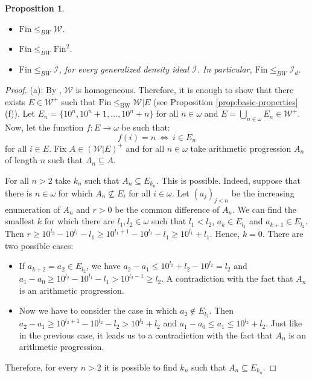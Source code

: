 \documentclass{amsart}
\theoremstyle{plain}
\newtheorem{proposition}[theorem]{Proposition}
\theoremstyle{definition}
\theoremstyle{remark}
\newcommand{\cI}{\mathcal{I}}
\newcommand{\I}{\cI}
\newcommand{\cW}{\mathcal{W}}
\newcommand{\fin}{\mathrm{Fin}}
\newcommand{\Fin}{\mathrm{Fin}}
\newcommand{\BW}{\mathrm{BW}}
\begin{document}
\begin{proposition}\
\label{prop:idealy_powyzej_Fin}
\begin{itemize}
    \item[(a)] $\Fin\leq_{BW}\mathcal{W}$. 
    \item[(b)] $\Fin\leq_{BW}\Fin^2$. 
    \item[(c)] $\fin \leq_{BW} \I$, for every generalized density ideal $\I$. In particular, $\Fin\leq_{BW}\I_d$.
\end{itemize}
\end{proposition}

\begin{proof}
(a): By \cite[Example 2.6]{KT}, $\cW$ is homogeneous. Therefore, it is enough to show that there exists $E \in \cW^+$ such that $\Fin \leq_{\BW} \cW|E$ (see Proposition \ref{prop:basic-properties}(f)).   Let $E_n=\{10^n, 10^n+1, \ldots, 10^n +n  \}   $ for all $n \in \omega$ and $E=\bigcup_{n \in \omega}E_n\in\cW^+$. Now, let the function $f: E \rightarrow \omega$ be such that:
\[ f(i) = n\ \iff\ i \in E_n\]
for all $i \in E$. Fix $A \in(\cW|E)^+$ and for all $n \in \omega$ take arithmetic progression $A_n$ of length $n$ such that $A_n \subseteq A$. 

For all $n > 2$ take $k_n$ such that $A_n \subseteq E_{k_n}$. This is possible. Indeed, suppose that there is $n \in \omega$ for which $A_n \nsubseteq E_i$ for all $i \in \omega$. Let $(a_j)_{j<n}$ be the increasing enumeration of $A_n$ and $r>0$ be the common difference of $A_n$. We can find the smallest $k$ for which there are $l_1,l_2\in \omega$ such that $l_1<l_2$, $a_k \in E_{l_1}$ and $a_{k+1} \in E_{l_2}$. Then $r\geq10^{l_2}-10^{l_1}-l_1\geq 10^{l_1+1}-10^{l
_1}-l_1\geq 10^{l_1}+l_1$. Hence, $k=0$. There are two possible cases:
\begin{itemize}
\item If $a_{k+2}=a_2 \in E_{l_2}$, we have $a_2-a_1\leq 10^{l_2}+l_2-10^{l_2}=l_2$ and $a_1-a_0\geq10^{l_2}-10^{l_1}-l_1>10^{l_2-1}\geq l_2$. A contradiction with the fact that $A_n$ is an arithmetic progression. 
\item Now we have to consider the case in which $a_2 \notin E_{l_2}$. Then $a_2-a_1\geq10^{l_2+1}-10^{l_2}-l_2>10^{l_2}+l_2$ and $a_1-a_0\leq a_1\leq 10^{l_2}+l_2$. Just like in the previous case, it leads us to a contradiction with the fact that $A_n$ is an arithmetic progression.
\end{itemize}
Therefore, for every $n > 2$ it is possible to find $k_n$ such that $A_n \subseteq E_{k_n}$.


\end{proof}
\end{document}
